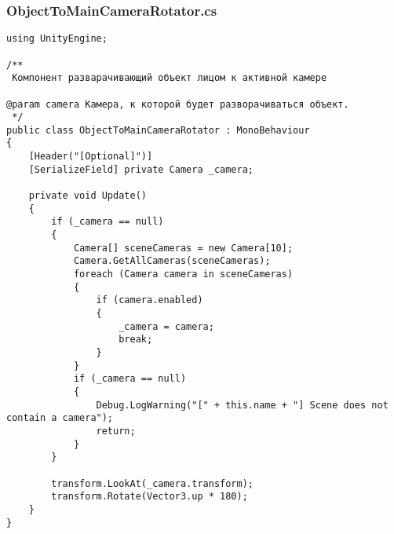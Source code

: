 \subsubsection*{ObjectToMainCameraRotator.cs}
\begin{verbatim}
﻿using UnityEngine;

/**
 Компонент разварачивающий объект лицом к активной камере

@param camera Камера, к которой будет разворачиваться объект.
 */
public class ObjectToMainCameraRotator : MonoBehaviour
{
    [Header("[Optional]")]
    [SerializeField] private Camera _camera;

    private void Update()
    {
        if (_camera == null)
        {
            Camera[] sceneCameras = new Camera[10];
            Camera.GetAllCameras(sceneCameras);
            foreach (Camera camera in sceneCameras)
            {
                if (camera.enabled)
                {
                    _camera = camera;
                    break;
                }
            }
            if (_camera == null)
            {
                Debug.LogWarning("[" + this.name + "] Scene does not contain a camera");
                return;
            }
        }

        transform.LookAt(_camera.transform);
        transform.Rotate(Vector3.up * 180);
    }
}

\end{verbatim}
